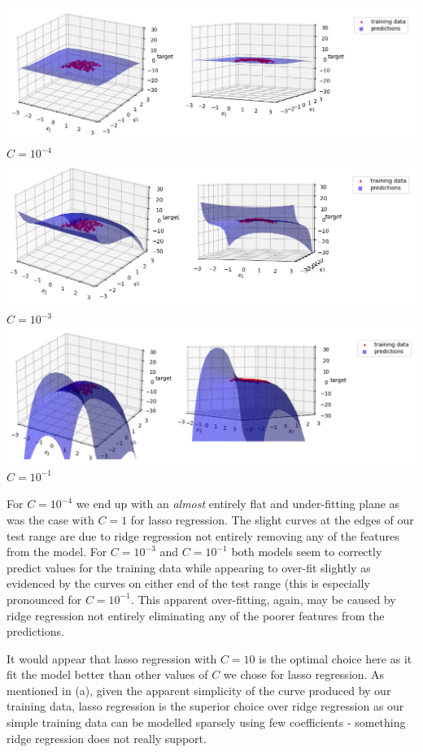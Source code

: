 \documentclass[12pt]{article}
\begin{document}
\begin{center}
    \includegraphics[scale=0.65]{fig_6.png}
    $C = 10^{-4}$
    \includegraphics[scale=0.65]{fig_7.png}
    $C = 10^{-3}$
    \includegraphics[scale=0.65]{fig_8.png}
    $C = 10^{-1}$
\end{center}

For $C = 10^{-4}$ we end up with an \textit{almost} entirely flat and under-fitting plane as was the case with $C = 1$ for lasso regression. The slight curves at the edges of our test range are due to ridge regression not entirely removing any of the features from the model. For $C = 10^{-3}$ and $C = 10^{-1}$ both models seem to correctly predict values for the training data while appearing to over-fit slightly as evidenced by the curves on either end of the test range (this is especially pronounced for $C = 10^{-1}$. This apparent over-fitting, again, may be caused by ridge regression not entirely eliminating any of the poorer features from the predictions.

It would appear that lasso regression with $C = 10$ is the optimal choice here as it fit the model better than other values of $C$ we chose for lasso regression. As mentioned in (a), given the apparent simplicity of the curve produced by our training data, lasso regression is the superior choice over ridge regression as our simple training data can be modelled sparsely using few coefficients - something ridge regression does not really support.
\end{document}

